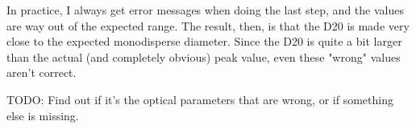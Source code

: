 \documentclass[10pt]{book}
\begin{document}
In practice, I always get error messages when doing the last step, and the
values are way out of the expected range. The result, then, is that the D20 is
made very close to the expected monodisperse diameter. Since the D20 is quite
a bit larger than the actual (and completely obvious) peak value, even these
"wrong" values aren't correct.

TODO: Find out if it's the optical parameters that are wrong, or if something
else is missing.



\end{document}
